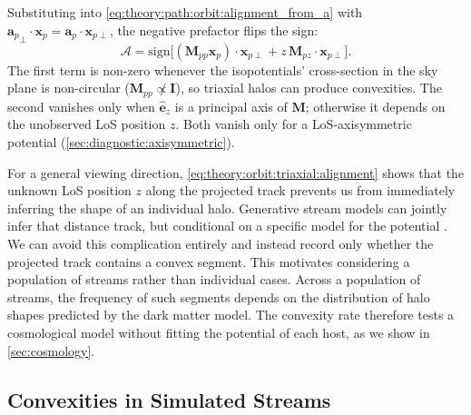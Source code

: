 \documentclass[linenumbers,twocolumn]{aastex701}
\renewcommand{\mbf}[1]{\boldsymbol{#1}}
\newcommand{\zhat}{\hat{\mbf{e}}_z} %
\newcommand{\xvec}{\mbf{x}}  %
\newcommand{\avec}{\mbf{a}}  %
\newcommand{\proj}[1]{{#1}_{p}}  %
\newcommand{\projperp}[1]{{#1}_{p \perp}}  %
\newcommand{\xsky}{\proj{\xvec}}  %
\newcommand{\asky}{\proj{\avec}}  %
\newcommand{\xskyperp}{\projperp{\xvec}}
\begin{document}
        Substituting into \cref{eq:theory:path:orbit:alignment_from_a} with ${\asky}_{\perp}\cdot\xsky = \asky\cdot\xskyperp$, the negative prefactor flips the sign:
        \begin{equation}\label{eq:theory:orbit:triaxial:alignment}
            \mathcal{A}
            = \mathrm{sign}\!\bigl[(\mbf{M}_{pp} \xsky) \cdot \xskyperp + z\,\mbf{M}_{pz} \cdot \xskyperp \bigr]. %
        \end{equation}
        The first term is non-zero whenever the isopotentials' cross-section in the sky plane is non-circular ($\mbf{M}_{pp} \not\propto \mbf{I}$), so triaxial halos can produce convexities. %
        The second vanishes only when $\zhat$ is a principal axis of $\mbf{M}$; otherwise it depends on the unobserved \gls{LoS} position $z$. %
        Both vanish only for a \gls{LoS}-axisymmetric potential (\autoref{sec:diagnostic:axisymmetric}). %

        For a general viewing direction, \cref{eq:theory:orbit:triaxial:alignment} shows that the unknown \gls{LoS} position $z$ along the projected track prevents us from immediately inferring the shape of an individual halo. %
        Generative stream models can jointly infer that distance track, but conditional on a specific model for the potential \citep{Fardal+:2015:GenerationMockTidal,Pearson:2022:MappingDarkMatter,Nibauer+Pearson:2026:TestingDarkMatter}. %
        We can avoid this complication entirely and instead record only whether the projected track contains a convex segment. %
        This motivates considering a population of streams rather than individual cases. %
        Across a population of streams, the frequency of such segments depends on the distribution of halo shapes predicted by the dark matter model. %
        The convexity rate therefore tests a cosmological model without fitting the potential of each host, as we show in \autoref{sec:cosmology}. %


    \subsection{Convexities in Simulated Streams}\label{sec:triaxial_potentials:simulations}
\end{document}

